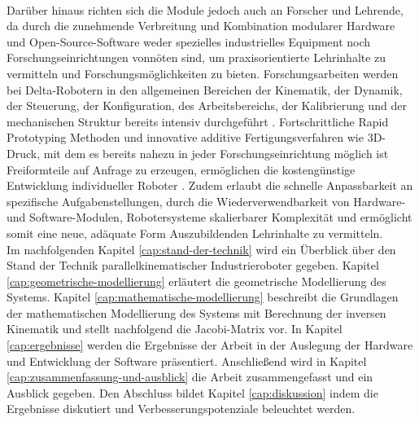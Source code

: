\documentclass[Bachelor, BMR, ngerman]{twbook}
\begin{document}
    \\
    Darüber hinaus richten sich die Module jedoch auch an Forscher und Lehrende, da durch die zunehmende Verbreitung und Kombination modularer Hardware und Open-Source-Software weder spezielles industrielles Equipment noch Forschungseinrichtungen vonnöten sind, um praxisorientierte Lehrinhalte zu vermitteln und Forschungsmöglichkeiten zu bieten. Forschungsarbeiten werden bei Delta-Robotern in den allgemeinen Bereichen der Kinematik, der Dynamik, der Steuerung, der Konfiguration, des Arbeitsbereichs, der Kalibrierung und der mechanischen Struktur bereits intensiv durchgeführt \cite{BrCo15}. Fortschrittliche Rapid Prototyping Methoden und innovative additive Fertigungsverfahren wie 3D-Druck, mit dem es bereits nahezu in jeder Forschungseinrichtung möglich ist Freiformteile auf Anfrage zu erzeugen, ermöglichen die kostengünstige Entwicklung individueller Roboter \cite{KrWa15,He18}. Zudem erlaubt die schnelle Anpassbarkeit an spezifische Aufgabenstellungen, durch die Wiederverwendbarkeit von Hardware- und Software-Modulen, Robotersysteme skalierbarer Komplexität und ermöglicht somit eine neue, adäquate Form Auszubildenden Lehrinhalte zu vermitteln.\\
    \newpage
    \noindent
    Im nachfolgenden Kapitel \ref{cap:stand-der-technik} wird ein Überblick über den Stand der Technik parallelkinematischer Industrieroboter gegeben. Kapitel \ref{cap:geometrische-modellierung} erläutert die geometrische Modellierung des Systems. Kapitel \ref{cap:mathematische-modellierung} beschreibt die Grundlagen der mathematischen Modellierung des Systems mit Berechnung der inversen Kinematik und stellt nachfolgend die Jacobi-Matrix vor. 
    In Kapitel \ref{cap:ergebnisse} werden die Ergebnisse der Arbeit in der Auslegung der Hardware und Entwicklung der Software präsentiert. Anschließend wird in Kapitel \ref{cap:zusammenfassung-und-ausblick} die Arbeit zusammengefasst und ein Ausblick gegeben. Den Abschluss bildet Kapitel \ref{cap:diskussion} indem die Ergebnisse diskutiert und Verbesserungspotenziale beleuchtet werden.


\end{document}
